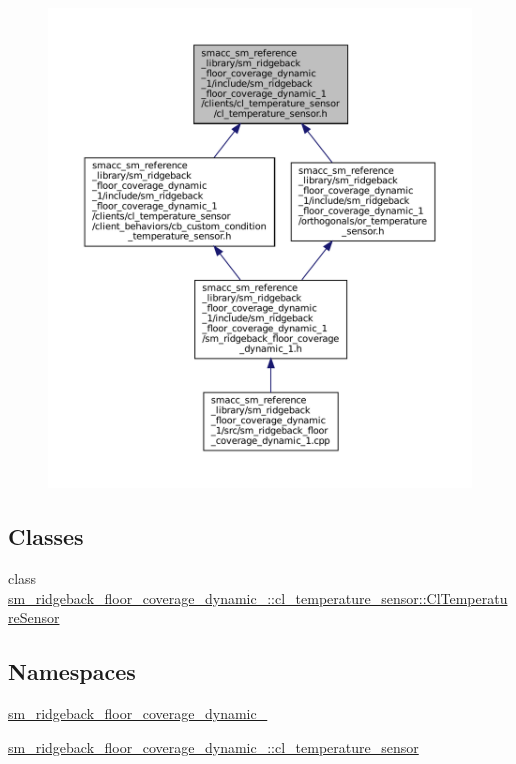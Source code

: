 \begin{figure}[H]
\begin{center}
\leavevmode
\includegraphics[width=350pt]{sm__ridgeback__floor__coverage__dynamic__1_2include_2sm__ridgeback__floor__coverage__dynamic__1_d3027306e1cae53b3ecefed44c647362}
\end{center}
\end{figure}
\subsection*{Classes}
\begin{DoxyCompactItemize}
\item 
class \hyperlink{classsm__ridgeback__floor__coverage__dynamic__1_1_1cl__temperature__sensor_1_1ClTemperatureSensor}{sm\+\_\+ridgeback\+\_\+floor\+\_\+coverage\+\_\+dynamic\+\_\+::cl\+\_\+temperature\+\_\+sensor\+::\+Cl\+Temperature\+Sensor}
\end{DoxyCompactItemize}
\subsection*{Namespaces}
\begin{DoxyCompactItemize}
\item 
 \hyperlink{namespacesm__ridgeback__floor__coverage__dynamic__1}{sm\+\_\+ridgeback\+\_\+floor\+\_\+coverage\+\_\+dynamic\+\_}
\item 
 \hyperlink{namespacesm__ridgeback__floor__coverage__dynamic__1_1_1cl__temperature__sensor}{sm\+\_\+ridgeback\+\_\+floor\+\_\+coverage\+\_\+dynamic\+\_\+::cl\+\_\+temperature\+\_\+sensor}
\end{DoxyCompactItemize}
